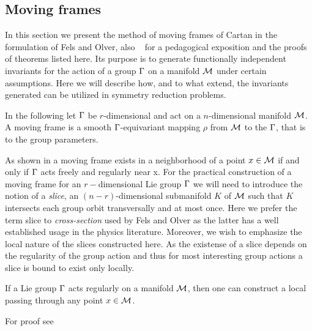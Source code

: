 

\subsection{Moving frames}
\label{sec:mf}

In this section we present the method of moving frames of
Cartan in the formulation of Fels and
Olver, also \cf~
for a pedagogical exposition and the proofs of theorems
listed here. Its purpose is to generate functionally
independent invariants for the action of a group $\Gamma$ on
a manifold $\mathcal{M}$ under certain assumptions. Here we will
describe how, and to what extend, the invariants generated can be utilized in 
symmetry reduction problems.

In the following let $\Gamma$ be $r$-dimensional and act on a
$n$-dimensional manifold $\mathcal{M}$.
A moving frame is a smooth $\Gamma$-equivariant mapping
$\rho$ from $\mathcal{M}$ to the $\Gamma$, that is to the group
parameters.

As shown in  a moving frame exists 
in a neighborhood of a point $x\in\mathcal{M}$ if and only if 
$\Gamma$ acts freely and regularly  near x. For the practical
construction of a moving frame for an $r-$dimensional Lie group
$\Gamma$ we will need to introduce the
notion of a \emph{slice}, an $(n-r)$-dimensional submanifold $K$
of $\mathcal{M}$ such that $K$ intersects each group orbit
transversally and at most once. Here we prefer the term slice 
to \emph{cross-section} used by Fels and Olver 
as the latter has a well established usage in the physics 
literature. Moreover, we wish to emphasize the local nature
of the slices constructed here. As the existense of a slice
depends on the regularity of the group action
and thus for most interesting group actions a slice is bound to
exist only locally.

\begin{proposition}%
 \label{pro:crossExists}
 If a Lie group $\Gamma$ acts regularly on a manifold 
 $\mathcal{M}$, then one can construct a
 local {\csection} passing through any point $x\in \mathcal{M}$.
\end{proposition}
For proof see 

